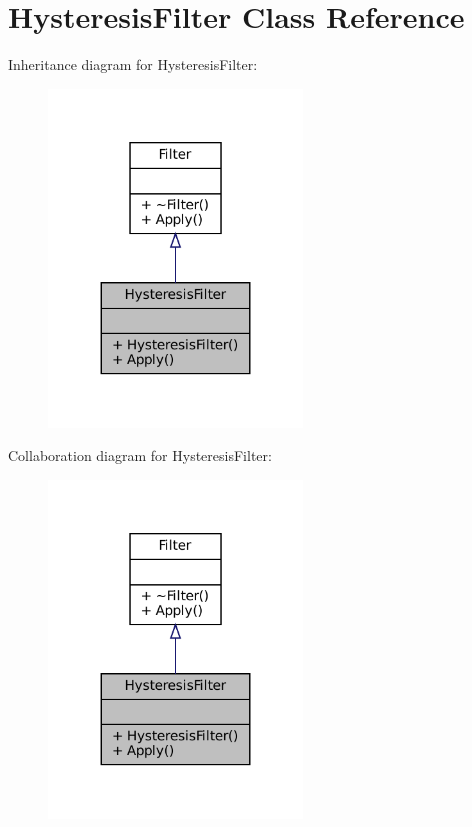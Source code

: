 \hypertarget{classHysteresisFilter}{}\section{Hysteresis\+Filter Class Reference}
\label{classHysteresisFilter}


Inheritance diagram for Hysteresis\+Filter\+:\nopagebreak
\begin{figure}[H]
\begin{center}
\leavevmode
\includegraphics[width=191pt]{classHysteresisFilter__inherit__graph}
\end{center}
\end{figure}


Collaboration diagram for Hysteresis\+Filter\+:\nopagebreak
\begin{figure}[H]
\begin{center}
\leavevmode
\includegraphics[width=191pt]{classHysteresisFilter__coll__graph}
\end{center}
\end{figure}
